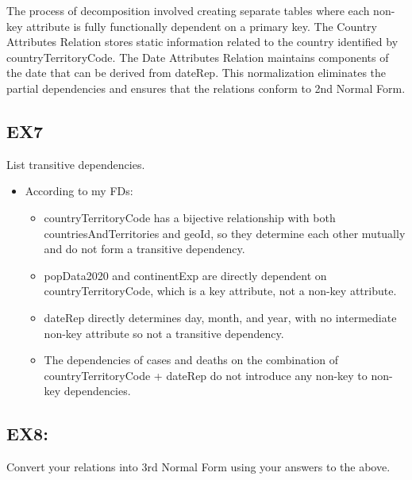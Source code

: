 \documentclass{article}
\begin{document}
\vspace{1mm}

The process of decomposition involved creating separate tables where each non-key attribute is fully functionally dependent on a primary key. The Country Attributes Relation stores static information related to the country identified by countryTerritoryCode. The Date Attributes Relation maintains components of the date that can be derived from dateRep. This normalization eliminates the partial dependencies and ensures that the relations conform to 2nd Normal Form.

\vspace{5mm}


\subsection{EX7}List transitive dependencies.
\begin{itemize}
  \item According to my FDs:
    
    \begin{itemize}
      \item countryTerritoryCode has a bijective relationship with both countriesAndTerritories and geoId, so they determine each other mutually and do not form a transitive dependency.
      
      \vspace{2mm}
      
      \item popData2020 and continentExp are directly dependent on countryTerritoryCode, which is a key attribute, not a non-key attribute.
      
      \vspace{2mm}
      
      \item dateRep directly determines day, month, and year, with no intermediate non-key attribute so not a transitive dependency.
      
      \vspace{2mm}
      
      \item The dependencies of cases and deaths on the combination of countryTerritoryCode + dateRep do not introduce any non-key to non-key dependencies.
    
    \end{itemize}
\end{itemize}

\subsection{EX8:} Convert your relations into 3rd Normal Form using your answers to the above.
\vspace{1mm}
\end{document}
